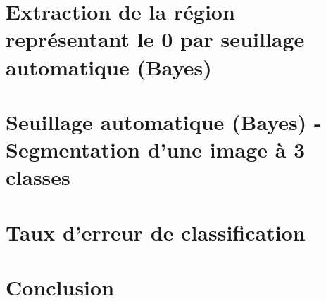\documentclass[a4paper,11pt]{article}
\begin{document}
  \section{Extraction de la région représentant le 0 par seuillage automatique (Bayes)}
  
  
  \section{Seuillage automatique (Bayes) - Segmentation d’une image à 3 classes}
  
  \section{Taux d’erreur de classification}
  
  \section*{Conclusion}
 
    
\end{document}
